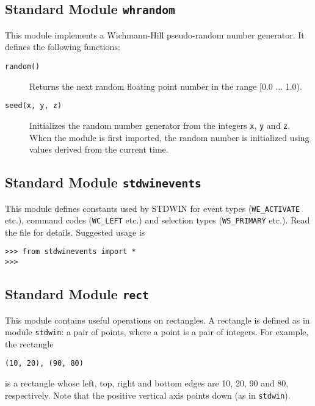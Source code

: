 \subsection{Standard Module {\tt whrandom}}

This module implements a Wichmann-Hill pseudo-random number generator.
It defines the following functions:
\begin{description}
\item[{\tt random()}]
Returns the next random floating point number in the range [0.0 ... 1.0).
\item[{\tt seed(x, y, z)}]
Initializes the random number generator from the integers
{\tt x},
{\tt y}
and
{\tt z}.
When the module is first imported, the random number is initialized
using values derived from the current time.
\end{description}

\subsection{Standard Module {\tt stdwinevents}}

This module defines constants used by STDWIN for event types
({\tt WE\_ACTIVATE} etc.), command codes ({\tt WC\_LEFT} etc.)
and selection types ({\tt WS\_PRIMARY} etc.).
Read the file for details.
Suggested usage is
\bcode\begin{verbatim}
>>> from stdwinevents import *
>>> 
\end{verbatim}\ecode

\subsection{Standard Module {\tt rect}}

This module contains useful operations on rectangles.
A rectangle is defined as in module
{\tt stdwin}:
a pair of points, where a point is a pair of integers.
For example, the rectangle
\bcode\begin{verbatim}
(10, 20), (90, 80)
\end{verbatim}\ecode
is a rectangle whose left, top, right and bottom edges are 10, 20, 90
and 80, respectively.
Note that the positive vertical axis points down (as in
{\tt stdwin}).

